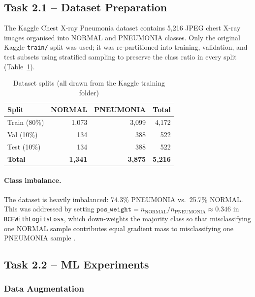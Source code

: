 \documentclass[11pt,a4paper]{article}
\begin{document}
\subsection{Task 2.1 -- Dataset Preparation}

The Kaggle Chest X-ray Pneumonia dataset \cite{kermany2018labeled} contains
5{,}216 JPEG chest X-ray images organised into NORMAL and PNEUMONIA classes.
Only the original Kaggle \texttt{train/} split was used; it was re-partitioned
into training, validation, and test subsets using stratified sampling to
preserve the class ratio in every split (Table~\ref{tab:splits}).

\begin{table}[H]
\centering
\caption{Dataset splits (all drawn from the Kaggle training folder)}
\label{tab:splits}
\begin{tabular}{lrrr}
\toprule
\textbf{Split} & \textbf{NORMAL} & \textbf{PNEUMONIA} & \textbf{Total} \\
\midrule
Train (80\%) & 1{,}073 & 3{,}099 & 4{,}172 \\
Val   (10\%) & 134     & 388     & 522 \\
Test  (10\%) & 134     & 388     & 522 \\
\midrule
\textbf{Total} & \textbf{1{,}341} & \textbf{3{,}875} & \textbf{5{,}216} \\
\bottomrule
\end{tabular}
\end{table}

\paragraph{Class imbalance.}
The dataset is heavily imbalanced: 74.3\% PNEUMONIA vs.\ 25.7\% NORMAL.
This was addressed by setting
$\texttt{pos\_weight} = n_\text{NORMAL} / n_\text{PNEUMONIA} \approx 0.346$
in \texttt{BCEWithLogitsLoss}, which down-weights the majority class so that
misclassifying one NORMAL sample contributes equal gradient mass to
misclassifying one PNEUMONIA sample \cite{king2001logistic}.

\subsection{Task 2.2 -- ML Experiments}

\subsubsection{Data Augmentation}
\end{document}
